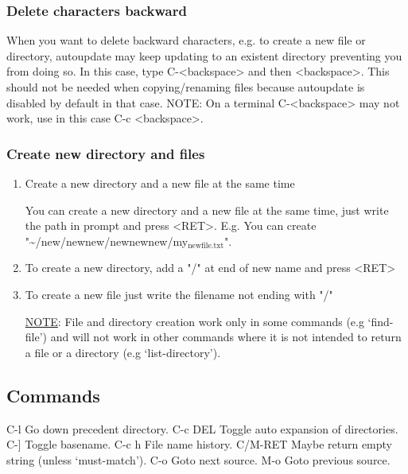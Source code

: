 \documentclass[11pt]{article}
\begin{document}
\subsubsection{Delete characters backward}
\label{sec:org936e64c}

When you want to delete backward characters, e.g. to create a new file or directory,
autoupdate may keep updating to an existent directory preventing you from doing so.
In this case, type C-<backspace> and then <backspace>.
This should not be needed when copying/renaming files because autoupdate is disabled
by default in that case.
NOTE: On a terminal C-<backspace> may not work, use in this case C-c <backspace>.

\subsubsection{Create new directory and files}
\label{sec:orga9b5cba}

\begin{enumerate}
\item Create a new directory and a new file at the same time
\label{sec:orgc47d15d}

You can create a new directory and a new file at the same time, 
just write the path in prompt and press <RET>.
E.g. You can create "\textasciitilde{}/new/newnew/newnewnew/my\(_{\text{newfile.txt}}\)".

\item To create a new directory, add a "/" at end of new name and press <RET>
\label{sec:org22d2879}

\item To create a new file just write the filename not ending with "/"
\label{sec:org631537a}

\uline{NOTE}: File and directory creation work only in some commands (e.g ‘find-file’)
and will not work in other commands where it is not intended to return a file or a directory
(e.g ‘list-directory’).
\end{enumerate}

\subsection{Commands}
\label{sec:org1ee3fc5}

C-l		Go down precedent directory.
C-c DEL		Toggle auto expansion of directories.
C-]		Toggle basename.
C-c h		File name history.
C/M-RET		Maybe return empty string (unless ‘must-match’).
C-o		Goto next source.
M-o		Goto previous source.
\end{document}
